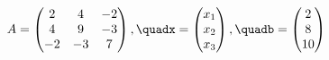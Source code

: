 \documentclass[preview]{standalone}
\begin{document}
\begin{align*}
A = \begin{pmatrix}2 & 4 & -2\\4 & 9 & -3\\-2 & -3 & 7\end{pmatrix}, \quadx = \begin{pmatrix} x_1 \\ x_2 \\ x_3 \end{pmatrix}, \quadb = \begin{pmatrix} 2 \\ 8 \\ 10 \end{pmatrix}
\end{align*}
\end{document}

